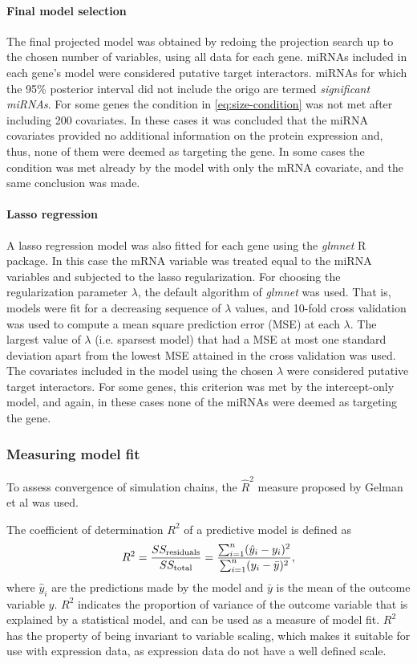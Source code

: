 \paragraph{Final model selection}
The final projected model was obtained by redoing the projection search up to
the chosen number of variables, using all data for each gene. miRNAs included
in each gene's model were considered putative target interactors. miRNAs for
which the 95\% posterior interval did not include the origo are termed
\emph{significant miRNAs}. For some genes the condition in \eqref{eq:size-condition} was not
met after including 200 covariates. In these cases it was concluded that the
miRNA covariates provided no additional information on the protein expression
and, thus, none of them were deemed as targeting the gene. In some cases the
condition was met already by the model with only the mRNA covariate, and the
same conclusion was made.

\paragraph{Lasso regression}
A lasso regression model was also fitted for each gene using the
\emph{glmnet} R package. In this case the mRNA variable was treated equal
to the miRNA variables and subjected to the lasso regularization. For choosing
the regularization parameter $\lambda$, the default algorithm of \emph{glmnet}
was used. That is, models were fit for a decreasing sequence of $\lambda$
values, and 10-fold cross validation was used to compute a mean square
prediction error (MSE) at each $\lambda$. The largest value of $\lambda$ (i.e.
sparsest model) that had a MSE at most one standard deviation apart from the
lowest MSE attained in the cross validation was used. The covariates included
in the model using the chosen $\lambda$ were considered putative target
interactors. For some genes, this criterion was met by the intercept-only
model, and again, in these cases none of the miRNAs were deemed as targeting
the gene.



\subsubsection{Measuring model fit}

To assess convergence of simulation chains, the $\hat{R}^2$ measure proposed
by Gelman et al was used.

The coefficient of determination $R^2$ of a predictive model is defined as
\begin{equation}
	R^2 = \frac{SS_{\textup{residuals}}}{SS_{\textup{total}}} = \frac{\sum_{i=1}^{n}(\hat{y}_i-y_i)^2}{\sum_{i=1}^{n}(y_i-\bar{y})^2},
\end{equation}
where $\hat{y}_i$ are the predictions made by the model and $\bar{y}$ is the
mean of the outcome variable $y$. $R^2$ indicates the proportion of variance
of the outcome variable that is explained by a statistical model, and can be
used as a measure of model fit. $R^2$ has the property of being invariant to
variable scaling, which makes it suitable for use with expression data, as
expression data do not have a well defined scale.

